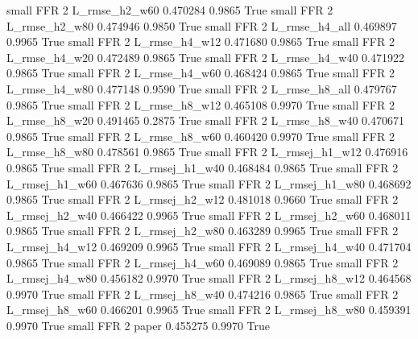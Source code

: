      small      FFR                 2  L_rmse_h2_w60   0.470284      0.9865    True
     small      FFR                 2  L_rmse_h2_w80   0.474946      0.9850    True
     small      FFR                 2  L_rmse_h4_all   0.469897      0.9965    True
     small      FFR                 2  L_rmse_h4_w12   0.471680      0.9865    True
     small      FFR                 2  L_rmse_h4_w20   0.472489      0.9865    True
     small      FFR                 2  L_rmse_h4_w40   0.471922      0.9865    True
     small      FFR                 2  L_rmse_h4_w60   0.468424      0.9865    True
     small      FFR                 2  L_rmse_h4_w80   0.477148      0.9590    True
     small      FFR                 2  L_rmse_h8_all   0.479767      0.9865    True
     small      FFR                 2  L_rmse_h8_w12   0.465108      0.9970    True
     small      FFR                 2  L_rmse_h8_w20   0.491465      0.2875    True
     small      FFR                 2  L_rmse_h8_w40   0.470671      0.9865    True
     small      FFR                 2  L_rmse_h8_w60   0.460420      0.9970    True
     small      FFR                 2  L_rmse_h8_w80   0.478561      0.9865    True
     small      FFR                 2 L_rmsej_h1_w12   0.476916      0.9865    True
     small      FFR                 2 L_rmsej_h1_w40   0.468484      0.9865    True
     small      FFR                 2 L_rmsej_h1_w60   0.467636      0.9865    True
     small      FFR                 2 L_rmsej_h1_w80   0.468692      0.9865    True
     small      FFR                 2 L_rmsej_h2_w12   0.481018      0.9660    True
     small      FFR                 2 L_rmsej_h2_w40   0.466422      0.9965    True
     small      FFR                 2 L_rmsej_h2_w60   0.468011      0.9865    True
     small      FFR                 2 L_rmsej_h2_w80   0.463289      0.9965    True
     small      FFR                 2 L_rmsej_h4_w12   0.469209      0.9965    True
     small      FFR                 2 L_rmsej_h4_w40   0.471704      0.9865    True
     small      FFR                 2 L_rmsej_h4_w60   0.469089      0.9865    True
     small      FFR                 2 L_rmsej_h4_w80   0.456182      0.9970    True
     small      FFR                 2 L_rmsej_h8_w12   0.464568      0.9970    True
     small      FFR                 2 L_rmsej_h8_w40   0.474216      0.9865    True
     small      FFR                 2 L_rmsej_h8_w60   0.466201      0.9965    True
     small      FFR                 2 L_rmsej_h8_w80   0.459391      0.9970    True
     small      FFR                 2          paper   0.455275      0.9970    True

